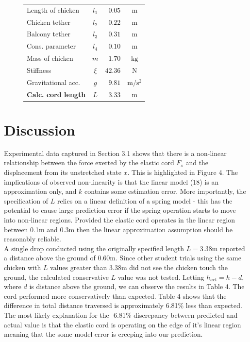 \documentclass[a4paper]{article}
\begin{document}
\begin{figure}
\begin{minipage}[t]{0.45\textwidth}
\begin{tabular}{lcrc}
			Length of chicken & $l_1$ & $0.05$ & $\si{\meter}$ \\
			Chicken tether & $l_2$ & $0.22$ & $\si{\meter}$ \\
			Balcony tether & $l_3$ & $0.31$ & $\si{\meter}$ \\
			Cons. parameter & $l_4$ & $0.10$ & $\si{\meter}$ \\
			Mass of chicken & $m$ & $1.70$ & $\si{\kilogram}$ \\
			Stiffness & $\xi$ & $42.36$ & $\si{\newton}$ \\
			Gravitational acc. & $g$ & $9.81$ & $\si{\meter\per\second^2}$ \\
			\midrule
			\textbf{Calc. cord length} & $L$ & $3.33$ & $\si{\meter}$\\
			\bottomrule
		\end{tabular}
	\end{minipage}
\end{figure}


\section{Discussion}
Experimental data captured in Section 3.1 shows that there is a non-linear relationship between the force exerted by the elastic cord $F_s$ and the displacement from its unstretched state $x$. This is highlighted in Figure 4. The implications of observed non-linearity is that the linear model (18) is an approximation only, and $k$ contains some estimation error. More importantly, the specification of $L$ relies on a linear definition of a spring model - this has the potential to cause large prediction error if the spring operation starts to move into non-linear regions. Provided the elastic cord operates in the linear region between 0.1$\si{\meter}$ and 0.3$\si{\meter}$ then the linear approximation assumption should be reasonably reliable.\\

A single drop conducted using the originally specified length $L = 3.38\si{\meter}$ reported a distance above the ground of $0.60\si{\meter}$. Since other student trials using the same chicken with $L$ values greater than $3.38\si{\meter}$ did not see the chicken touch the ground, the calculated conservative $L$ value was not tested. Letting $h_{act} = h - d$, where $d$ is distance above the ground, we can observe the results in Table 4. The cord performed more conservatively than expected. Table 4 shows that the difference in total distance traversed is approximately 6.81\% less than expected. The most likely explanation for the -6.81\% discrepancy between predicted and actual value is that the elastic cord is operating on the edge of it's linear region meaning that the some model error is creeping into our prediction.
\end{document}
